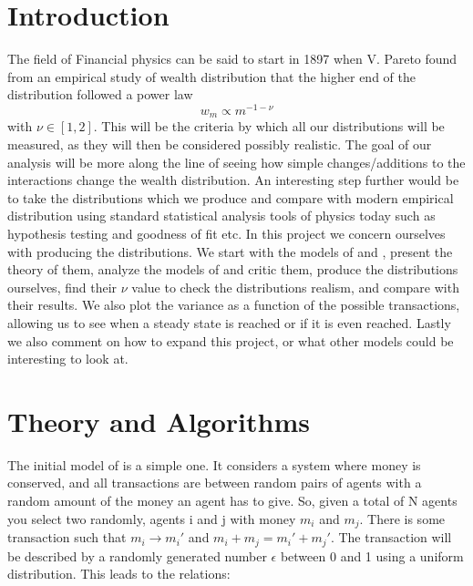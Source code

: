 \documentclass[a4paper,11pt]{article}
\begin{document}
{\begin{abstract}
\end{abstract}



		
\section*{Introduction}

The field of Financial physics can be said to start in 1897 when V. Pareto \cite{Pareto_1897} found from an empirical study of wealth distribution that the higher end of the distribution followed a power law
 \begin{equation}
 w_m \propto m^{-1-\nu}
 \label{powerLaw}
 \end{equation}
with $\nu \in [1,2]$. This will be the criteria by which all our distributions will be measured, as they will then be considered possibly realistic. The goal of our analysis will be more along the line of seeing how simple changes/additions to the interactions change the wealth distribution. An interesting step further would be to take the distributions which we produce and compare with modern empirical distribution using standard statistical analysis tools of physics today such as hypothesis testing and goodness of fit etc. In this project we concern ourselves with producing the distributions. We start with the models of \cite{GibbsVsnon-Gibbs} and \cite{AgentBasedModels}, present the theory of them, analyze the models of  and critic them, produce the distributions ourselves, find their $\nu$ value to check the distributions realism, and compare with their results. We also plot the variance as a function of the possible transactions, allowing us to see when a steady state is reached or if it is even reached. Lastly we also comment on how to expand this project, or what other models could be interesting to look at.





\section*{Theory and Algorithms}

The initial model of \cite{GibbsVsnon-Gibbs} is a simple one. It considers a system where money is conserved, and all transactions are between random pairs of agents with a random amount of the money an agent has to give. So, given a total of N agents you select two randomly, agents i and j with money $m_i$ and $m_j$. There is some transaction such that $m_i \rightarrow m_i'$ and $m_i + m_j = m_i' + m_j'$. The transaction will be described by a randomly generated number $\epsilon$ between 0 and 1 using a uniform distribution. This leads to the relations:

}
\end{document}
